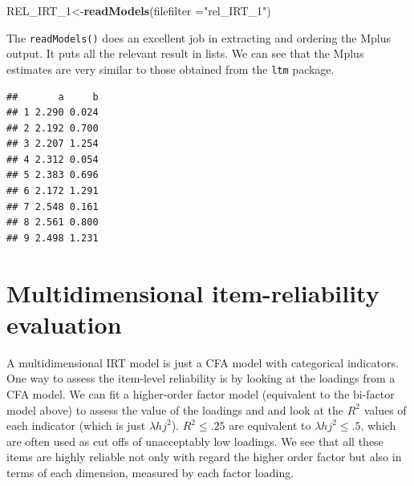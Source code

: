 \documentclass[]{book}
\newenvironment{Shaded}{\begin{snugshade}}{\end{snugshade}}
\newcommand{\DataTypeTok}[1]{\textcolor[rgb]{0.13,0.29,0.53}{#1}}
\newcommand{\DecValTok}[1]{\textcolor[rgb]{0.00,0.00,0.81}{#1}}
\newcommand{\KeywordTok}[1]{\textcolor[rgb]{0.13,0.29,0.53}{\textbf{#1}}}
\newcommand{\NormalTok}[1]{#1}
\newcommand{\OperatorTok}[1]{\textcolor[rgb]{0.81,0.36,0.00}{\textbf{#1}}}
\newcommand{\StringTok}[1]{\textcolor[rgb]{0.31,0.60,0.02}{#1}}
\begin{document}
\begin{Shaded}
\begin{Highlighting}[]
\NormalTok{REL_IRT_}\DecValTok{1}\NormalTok{<-}\KeywordTok{readModels}\NormalTok{(}\DataTypeTok{filefilter =}\StringTok{"rel_IRT_1"}\NormalTok{)}
\end{Highlighting}
\end{Shaded}

The \texttt{readModels()} does an excellent job in extracting and ordering the Mplus output. It puts all the relevant result in lists. We can see that the Mplus estimates are very similar to those obtained from the \texttt{ltm} package.

\begin{Shaded}
\end{Shaded}

\begin{verbatim}
##       a     b
## 1 2.290 0.024
## 2 2.192 0.700
## 3 2.207 1.254
## 4 2.312 0.054
## 5 2.383 0.696
## 6 2.172 1.291
## 7 2.548 0.161
## 8 2.561 0.800
## 9 2.498 1.231
\end{verbatim}

\hypertarget{multidimensional-item-reliability-evaluation}{%
\section{Multidimensional item-reliability evaluation}\label{multidimensional-item-reliability-evaluation}}

A multidimensional IRT model is just a CFA model with categorical indicators. One way to assess the item-level reliability is by looking at the loadings from a CFA model. We can fit a higher-order factor model (equivalent to the bi-factor model above) to assess the value of the loadings and and look at the \(R^2\) values of each indicator (which is just \(\lambda{hj}^2\)). \(R^2\leq.25\) are equivalent to \(\lambda{hj}^2\leq.5\), which are often used as cut offs of unacceptably low loadings. We see that all these items are highly reliable not only with regard the higher order factor but also in terms of each dimension, measured by each factor loading.
\end{document}
